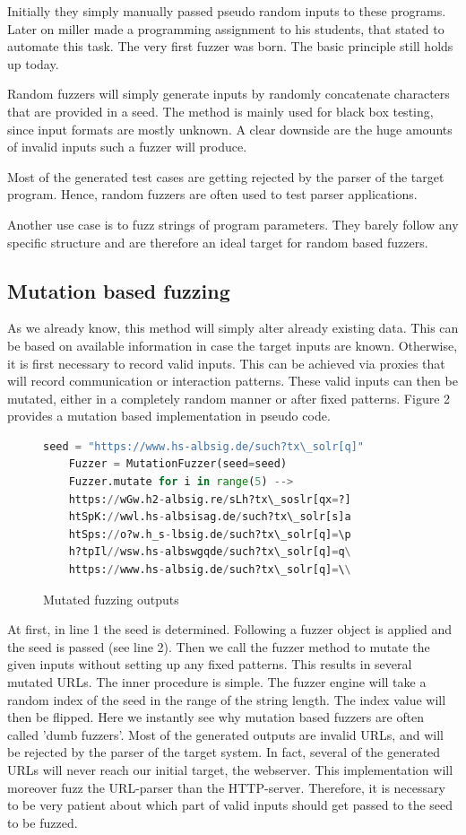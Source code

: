 \documentclass[journal=tosc,final]{iacrtrans}
\begin{document}
Initially they simply manually passed pseudo random inputs to these programs. Later on miller made a programming assignment to his students, that stated to automate this task. The very first fuzzer was born. The basic principle still holds up today. 

Random fuzzers will simply generate inputs by randomly concatenate characters that are provided in a seed. The method is mainly used for black box testing, since input formats are mostly unknown. A clear downside are the huge amounts of invalid inputs such a fuzzer will produce. 

Most of the generated test cases are getting rejected by the parser of the target program. Hence, random fuzzers are often used to test parser applications.

Another use case is to fuzz strings of program parameters. They barely follow any specific structure and are therefore an ideal target for random based fuzzers. 
\subsection{Mutation based fuzzing}
As we already know, this method will simply alter already existing data. This can be based on available information in case the target inputs are known. Otherwise, it is first necessary to record valid inputs. This can be achieved via proxies that will record communication or interaction patterns. These valid inputs can then be mutated, either in a completely random manner or after fixed patterns. Figure 2 provides a mutation based implementation in pseudo code. 

\begin{figure}[h]
\caption{Mutated fuzzing outputs}
 \begin{lstlisting}[language=python,style=code]
	seed = "https://www.hs-albsig.de/such?tx\_solr[q]"
	Fuzzer = MutationFuzzer(seed=seed)
	Fuzzer.mutate for i in range(5) -->
	https://wGw.h2-albsig.re/sLh?tx\_soslr[qx=?]
	htSpK://wwl.hs-albsisag.de/such?tx\_solr[s]a
	htSps://o?w.h_s-lbsig.de/such?tx\_solr[q]=\p
	h?tpIl//wsw.hs-albswgqde/such?tx\_solr[q]=q\
	https://www.hs-albsig.de/such?tx\_solr[q]=\\
\end{lstlisting}

\end{figure}
At first, in line 1 the seed is determined. Following a fuzzer object is applied and the seed is passed (see line 2). Then we call the fuzzer method to mutate the given inputs without setting up any fixed patterns. This results in several mutated URLs. The inner procedure is simple. The fuzzer engine will take a random index of the seed in the range of the string length. The index value will then be flipped.  Here we instantly see why mutation based fuzzers are often called 'dumb fuzzers'. 
Most of the generated outputs are invalid URLs, and will be rejected by the parser of the target system. In fact, several of the generated URLs will never reach our initial target, the webserver. This implementation will moreover fuzz the URL-parser than the HTTP-server.
Therefore, it is necessary to be very patient about which part of valid inputs should get passed to the seed to be fuzzed. 
\end{document}
